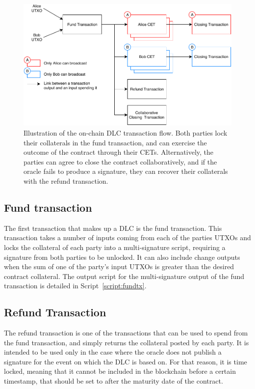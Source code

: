\begin{figure}
  \centering
  \includegraphics[width=\columnwidth]{Figures/BaseDlc.pdf}
  \caption{Illustration of the on-chain DLC transaction flow. Both parties lock their collaterals in the fund transaction, and can exercise the outcome of the contract through their CETs. Alternatively, the parties can agree to close the contract collaboratively, and if the oracle fails to produce a signature, they can recover their collaterals with the refund transaction.}
  \label{fig:basedlc}
\end{figure}

\subsection{Fund transaction}
The first transaction that makes up a DLC is the fund transaction.
This transaction takes a number of inputs coming from each of the parties UTXOs and locks the collateral of each party into a multi-signature script, requiring a signature from both parties to be unlocked.
It can also include change outputs when the sum of one of the party’s input UTXOs is greater than the desired contract collateral.
The output script for the multi-signature output of the fund transaction is detailed in Script~\ref{script:fundtx}.

\subsection{Refund Transaction}
The refund transaction is one of the transactions that can be used to spend from the fund transaction, and simply returns the collateral posted by each party.
It is intended to be used only in the case where the oracle does not publish a signature for the event on which the DLC is based on.
For that reason, it is time locked, meaning that it cannot be included in the blockchain before a certain timestamp, that should be set to after the maturity date of the contract.

